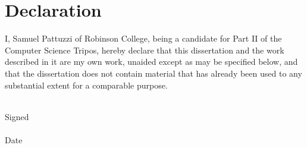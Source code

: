 \newpage
\section*{Declaration}

I, Samuel Pattuzzi of Robinson College, being a candidate for Part II of the
Computer Science Tripos, hereby declare that this dissertation and the work
described in it are my own work, unaided except as may be specified below, and
that the dissertation does not contain material that has already been used to
any substantial extent for a comparable purpose.

\begin{tabbing}
\bigskip \\
Signed   \= \\
\medskip \\
Date \> \thedate \\
\end{tabbing}

\cleardoublepage
{
 \hypersetup{linkcolor=black}
\setcounter{tocdepth}{2}
\tableofcontents
}
